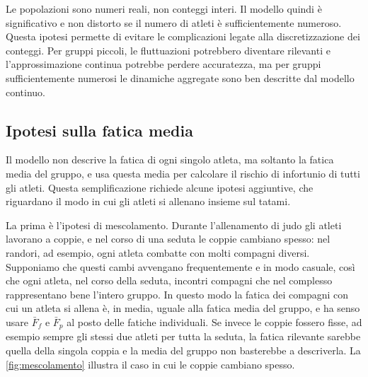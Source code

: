 Le popolazioni sono numeri reali, non conteggi interi. Il modello quindi è significativo e non distorto se il numero di atleti è sufficientemente numeroso. Questa ipotesi permette di evitare le complicazioni legate alla discretizzazione dei conteggi. Per gruppi piccoli, le fluttuazioni potrebbero diventare rilevanti e l'approssimazione continua potrebbe perdere accuratezza, ma per gruppi sufficientemente numerosi le dinamiche aggregate sono ben descritte dal modello continuo. \par

\subsection{Ipotesi sulla fatica media}\label{sec:ipotesi-fatica}

Il modello non descrive la fatica di ogni singolo atleta, ma soltanto la fatica media del gruppo, e usa questa media per calcolare il rischio di infortunio di tutti gli atleti. Questa semplificazione richiede alcune ipotesi aggiuntive, che riguardano il modo in cui gli atleti si allenano insieme sul tatami. \par

La prima è l'ipotesi di mescolamento. Durante l'allenamento di judo gli atleti lavorano a coppie, e nel corso di una seduta le coppie cambiano spesso: nel randori, ad esempio, ogni atleta combatte con molti compagni diversi. Supponiamo che questi cambi avvengano frequentemente e in modo casuale, così che ogni atleta, nel corso della seduta, incontri compagni che nel complesso rappresentano bene l'intero gruppo. In questo modo la fatica dei compagni con cui un atleta si allena è, in media, uguale alla fatica media del gruppo, e ha senso usare $\bar{F}_f$ e $\bar{F}_p$ al posto delle fatiche individuali. Se invece le coppie fossero fisse, ad esempio sempre gli stessi due atleti per tutta la seduta, la fatica rilevante sarebbe quella della singola coppia e la media del gruppo non basterebbe a descriverla. La \autoref{fig:mescolamento} illustra il caso in cui le coppie cambiano spesso. \par

